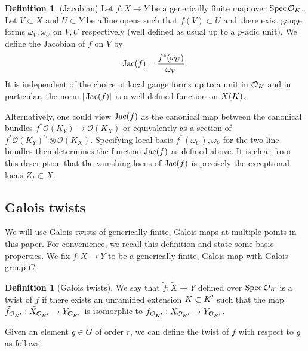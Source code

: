 \documentclass[10pt]{article}
\theoremstyle{plain}
\theoremstyle{definition}
\newtheorem{definition}[theorem]{Definition}
\numberwithin{equation}{section}
\begin{document}
\begin{definition}\label{defn: Jacobian}(Jacobian)
Let $f:X \to Y$ be a generically finite map over $\operatorname{Spec} {{\mathcal O}_{K}}$. Let $V \subset X$ and $U \subset Y$ be affine opens such that $f(V) \subset U$ and there exist gauge forms $\omega_V,\omega_U$ on $V,U$ respectively (well defined as usual up to a $p$-adic unit). We define the Jacobian of $f$ on $V$ by
\[\operatorname{Jac}(f) = \frac{f^*(\omega_U)}{\omega_V}.\]
It is independent of the choice of local gauge forms up to a unit in ${{\mathcal O}_{K}}$ and in particular, the norm $|\operatorname{Jac}(f)|$ is a well defined function on $X(K)$.

Alternatively, one could view $\operatorname{Jac}(f)$ as the canonical map between the canonical bundles $f^*\mathscr O(K_Y) \to \mathscr O(K_X)$ or equivalently as a section of $f^*\mathscr O(K_Y)^{\vee}\otimes\mathscr O(K_X)$. Specifying local basis $f^*(\omega_U),\omega_V$ for the two line bundles then determines the function $\operatorname{Jac}(f)$ as defined above. It is clear from this description that the vanishing locus of $\operatorname{Jac}(f)$ is precisely the exceptional locus $Z_f \subset X$.

\end{definition}

\subsection{Galois twists}

We will use Galois twists of generically finite, Galois maps at multiple points in this paper. For convenience, we recall this definition and state some basic properties. We fix $f: X \to Y$ to be a generically finite, Galois map with Galois group $G$. 

\begin{definition}[Galois twists]
We say that $\widetilde{f}: \widetilde{X} \to Y$ defined over $\operatorname{Spec} {{\mathcal O}_{K}}$ is a twist of $f$ if there exists an unramified extension $K \subset K'$ such that the map $\widetilde{f}_{\mathcal O_{K'}}: \widetilde{X}_{\mathcal O_{K'}} \to Y_{\mathcal O_{K'}}$ is isomorphic to $f_{\mathcal O_{K'}}: X_{\mathcal O_{K'}} \to Y_{\mathcal O_{K'}}$.  
\end{definition}

Given an element $g \in G$ of order $r$, we can define the twist of $f$ with respect to $g$ as follows. 
\end{document}
